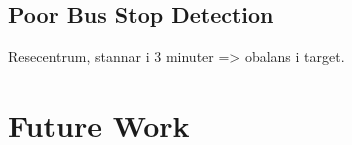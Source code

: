 \subsection{Poor Bus Stop Detection}
Resecentrum, stannar i 3 minuter => obalans i target.

\section{Future Work}
